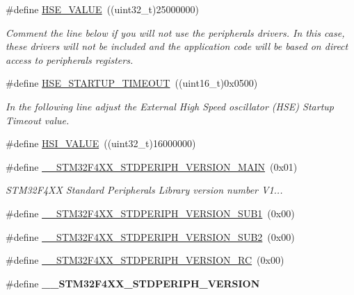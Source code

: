\begin{DoxyCompactItemize}
\item 
\#define \hyperlink{group___library__configuration__section_gaeafcff4f57440c60e64812dddd13e7cb}{H\-S\-E\-\_\-\-V\-A\-L\-U\-E}~((uint32\-\_\-t)25000000)
\begin{DoxyCompactList}\small\item\em Comment the line below if you will not use the peripherals drivers. In this case, these drivers will not be included and the application code will be based on direct access to peripherals registers. \end{DoxyCompactList}\item 
\#define \hyperlink{group___library__configuration__section_ga68ecbc9b0a1a40a1ec9d18d5e9747c4f}{H\-S\-E\-\_\-\-S\-T\-A\-R\-T\-U\-P\-\_\-\-T\-I\-M\-E\-O\-U\-T}~((uint16\-\_\-t)0x0500)
\begin{DoxyCompactList}\small\item\em In the following line adjust the External High Speed oscillator (H\-S\-E) Startup Timeout value. \end{DoxyCompactList}\item 
\#define \hyperlink{group___library__configuration__section_gaaa8c76e274d0f6dd2cefb5d0b17fbc37}{H\-S\-I\-\_\-\-V\-A\-L\-U\-E}~((uint32\-\_\-t)16000000)
\item 
\#define \hyperlink{group___library__configuration__section_gab16ffe03509714c63d5e530131c494f4}{\-\_\-\-\_\-\-S\-T\-M32\-F4\-X\-X\-\_\-\-S\-T\-D\-P\-E\-R\-I\-P\-H\-\_\-\-V\-E\-R\-S\-I\-O\-N\-\_\-\-M\-A\-I\-N}~(0x01)
\begin{DoxyCompactList}\small\item\em S\-T\-M32\-F4\-X\-X Standard Peripherals Library version number V1... \end{DoxyCompactList}\item 
\#define \hyperlink{group___library__configuration__section_gadce716e810a51b042298fb21b63e5366}{\-\_\-\-\_\-\-S\-T\-M32\-F4\-X\-X\-\_\-\-S\-T\-D\-P\-E\-R\-I\-P\-H\-\_\-\-V\-E\-R\-S\-I\-O\-N\-\_\-\-S\-U\-B1}~(0x00)
\item 
\#define \hyperlink{group___library__configuration__section_ga4b16607e43a35289dc5ebb608b1261d4}{\-\_\-\-\_\-\-S\-T\-M32\-F4\-X\-X\-\_\-\-S\-T\-D\-P\-E\-R\-I\-P\-H\-\_\-\-V\-E\-R\-S\-I\-O\-N\-\_\-\-S\-U\-B2}~(0x00)
\item 
\#define \hyperlink{group___library__configuration__section_gad5bec5e54ac96b9238a6363f2088f85c}{\-\_\-\-\_\-\-S\-T\-M32\-F4\-X\-X\-\_\-\-S\-T\-D\-P\-E\-R\-I\-P\-H\-\_\-\-V\-E\-R\-S\-I\-O\-N\-\_\-\-R\-C}~(0x00)
\item 
\#define {\bfseries \-\_\-\-\_\-\-S\-T\-M32\-F4\-X\-X\-\_\-\-S\-T\-D\-P\-E\-R\-I\-P\-H\-\_\-\-V\-E\-R\-S\-I\-O\-N}
\end{DoxyCompactItemize}


